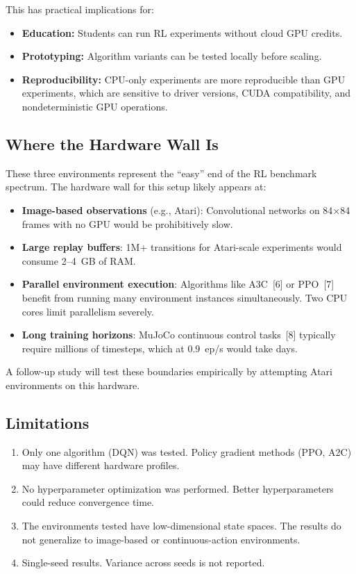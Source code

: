 \documentclass[11pt,a4paper]{article}
\begin{document}
This has practical implications for:
\begin{itemize}
    \item \textbf{Education:} Students can run RL experiments without cloud GPU credits.
    \item \textbf{Prototyping:} Algorithm variants can be tested locally before scaling.
    \item \textbf{Reproducibility:} CPU-only experiments are more reproducible than GPU experiments, which are sensitive to driver versions, CUDA compatibility, and nondeterministic GPU operations.
\end{itemize}

\subsection{Where the Hardware Wall Is}

These three environments represent the ``easy'' end of the RL benchmark spectrum. The hardware wall for this setup likely appears at:
\begin{itemize}
    \item \textbf{Image-based observations} (e.g., Atari): Convolutional networks on 84$\times$84 frames with no GPU would be prohibitively slow.
    \item \textbf{Large replay buffers}: 1M+ transitions for Atari-scale experiments would consume 2--4~GB of RAM.
    \item \textbf{Parallel environment execution}: Algorithms like A3C~[6] or PPO~[7] benefit from running many environment instances simultaneously. Two CPU cores limit parallelism severely.
    \item \textbf{Long training horizons}: MuJoCo continuous control tasks~[8] typically require millions of timesteps, which at 0.9~ep/s would take days.
\end{itemize}

A follow-up study will test these boundaries empirically by attempting Atari environments on this hardware.

\subsection{Limitations}

\begin{enumerate}
    \item Only one algorithm (DQN) was tested. Policy gradient methods (PPO, A2C) may have different hardware profiles.
    \item No hyperparameter optimization was performed. Better hyperparameters could reduce convergence time.
    \item The environments tested have low-dimensional state spaces. The results do not generalize to image-based or continuous-action environments.
    \item Single-seed results. Variance across seeds is not reported.
\end{enumerate}
\end{document}
